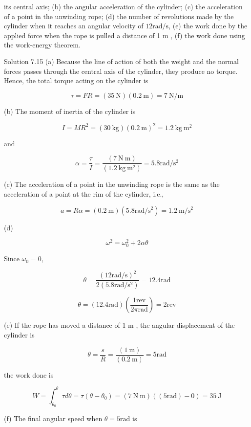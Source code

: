 \documentclass[10pt]{article}
\numberwithin{equation}{section}
\begin{document}
its central axis; (b) the angular acceleration of the cylinder; (c) the acceleration of a point in the unwinding rope; (d) the number of revolutions made by the cylinder when it reaches an angular velocity of $12 \mathrm{rad} / \mathrm{s}$, (e) the work done by the applied force when the rope is pulled a distance of 1 m , (f) the work done using the work-energy theorem.

Solution 7.15 (a) Because the line of action of both the weight and the normal forces passes through the central axis of the cylinder, they produce no torque. Hence, the total torque acting on the cylinder is

$$
\tau=F R=(35 \mathrm{~N})(0.2 \mathrm{~m})=7 \mathrm{~N} / \mathrm{m}
$$

(b) The moment of inertia of the cylinder is

$$
I=M R^{2}=(30 \mathrm{~kg})(0.2 \mathrm{~m})^{2}=1.2 \mathrm{~kg} \mathrm{~m}^{2}
$$

and

$$
\alpha=\frac{\tau}{I}=\frac{(7 \mathrm{~N} \mathrm{~m})}{\left(1.2 \mathrm{~kg} \mathrm{~m}{ }^{2}\right)}=5.8 \mathrm{rad} / \mathrm{s}^{2}
$$

(c) The acceleration of a point in the unwinding rope is the same as the acceleration of a point at the rim of the cylinder, i.e.,

$$
a=R \alpha=(0.2 \mathrm{~m})\left(5.8 \mathrm{rad} / \mathrm{s}^{2}\right)=1.2 \mathrm{~m} / \mathrm{s}^{2}
$$

(d)

$$
\omega^{2}=\omega_{0}^{2}+2 \alpha \theta
$$

Since $\omega_{0}=0$,

$$
\theta=\frac{(12 \mathrm{rad} / \mathrm{s})^{2}}{2\left(5.8 \mathrm{rad} / \mathrm{s}^{2}\right)}=12.4 \mathrm{rad}
$$

$$
\theta=(12.4 \mathrm{rad})\left(\frac{1 \mathrm{rev}}{2 \pi \mathrm{rad}}\right)=2 \mathrm{rev}
$$

(e) If the rope has moved a distance of 1 m , the angular displacement of the cylinder is

$$
\theta=\frac{s}{R}=\frac{(1 \mathrm{~m})}{(0.2 \mathrm{~m})}=5 \mathrm{rad}
$$

the work done is

$$
W=\int_{\theta_{0}}^{\theta} \tau d \theta=\tau\left(\theta-\theta_{0}\right)=(7 \mathrm{~N} \mathrm{~m})((5 \mathrm{rad})-0)=35 \mathrm{~J}
$$

(f) The final angular speed when $\theta=5 \mathrm{rad}$ is
\end{document}
